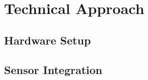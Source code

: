 \section{Technical Approach}
\label{sec:TechnicalApproach}


\subsection{Hardware Setup}
\label{sec:TechnicalApproach:HardwareSetup}


\subsection{Sensor Integration}
\label{sec:TechnicalApproach:SensorIntegration}

